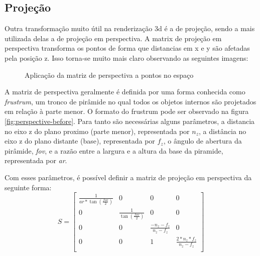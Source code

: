 \subsection{Projeção}

Outra transformação muito útil na renderização 3d é a de projeção, sendo a mais utilizada delas a de projeção em perspectiva. A matrix de projeção em perspectiva transforma os pontos de forma que distancias em x e y são afetadas pela posição z. Isso torna-se muito mais claro observando as seguintes imagens:

\begin{figure}[]
  \centering
  \hfill
  \caption{Aplicação da matriz de perspectiva a pontos no espaço}
\end{figure}

A matriz de perspectiva geralmente é definida por uma forma conhecida como \textit{frustrum}, um tronco de pirâmide no qual todos os objetos internos são projetados em relação à parte menor. O formato do frustrum pode ser observado na figura \ref{fig:perspective-before}. Para tanto são necessárias alguns parâmetros, a distancia no eixo z do plano proximo (parte menor), representada por $n_z$, a distância no eixo z do plano distante (base), representada por $f_z$, o ângulo de abertura da pirâmide, \textit{fov}, e a razão entre a largura e a altura da base da piramide, representada por \textit{ar}.

Com esses parâmetros, é possível definir a matriz de projeção em perspectiva da seguinte forma:
\begin{equation}
S = 
\begin{bmatrix}
    \frac{1}{ar*\tan(\frac{fov}{2})} & 0 & 0 & 0\\
    0 & \frac{1}{\tan(\frac{fov}{2})} & 0 & 0\\
    0 & 0 & \frac{-n_z-f_z}{n_z-f_z} & 0\\
    0 & 0 & 1 & \frac{2*n_z*f_z}{n_z-f_z}\\
\end{bmatrix}
\end{equation}

